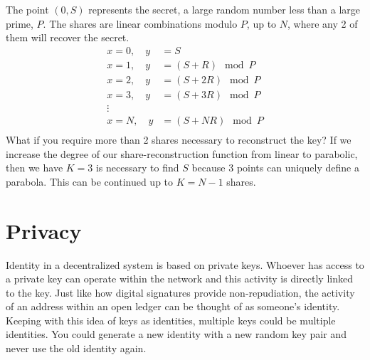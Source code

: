 The point $(0,S)$ represents the secret, a large random number less than a large prime, $P$. The shares are linear combinations modulo $P$, up to $N$, where any 2 of them will recover the secret.
\begin{align*}
x=0,\quad y&=S\\
x=1,\quad y&=(S+R)\mod P\\
x=2,\quad y&=(S+2R)\mod P\\
x=3,\quad y&=(S+3R)\mod P\\
\vdots\\
x=N,\quad y&=(S+NR)\mod P\\
\end{align*}
What if you require more than 2 shares necessary to reconstruct the key? If we increase the degree of our share-reconstruction function from linear to parabolic, then we have $K=3$ is necessary to find $S$ because 3 points can uniquely define a parabola. This can be continued up to $K=N-1$ shares.



\section{Privacy}\label{Se:Privacy}
Identity in a decentralized system is based on private keys. Whoever has access to a private key can operate within the network and this activity is directly linked to the key. Just like how digital signatures provide non-repudiation, the activity of an address within an open ledger can be thought of as someone's identity. Keeping with this idea of keys as identities, multiple keys could be multiple identities. You could generate a new identity with a new random key pair and never use the old identity again. 

